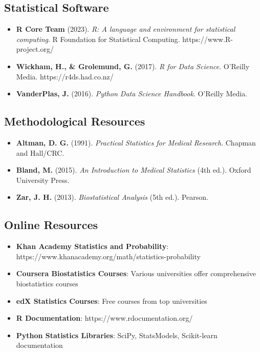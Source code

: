 \documentclass[
  11pt,
  letterpaper,
  oneside]{book}
\providecommand{\tightlist}{%
  \setlength{\itemsep}{0pt}\setlength{\parskip}{0pt}}\usepackage{longtable,booktabs,array}
\begin{document}
\subsection*{Statistical Software}\label{statistical-software}

\begin{itemize}
\tightlist
\item
  \textbf{R Core Team} (2023). \emph{R: A language and environment for
  statistical computing}. R Foundation for Statistical Computing.
  https://www.R-project.org/
\item
  \textbf{Wickham, H., \& Grolemund, G.} (2017). \emph{R for Data
  Science}. O'Reilly Media. https://r4ds.had.co.nz/
\item
  \textbf{VanderPlas, J.} (2016). \emph{Python Data Science Handbook}.
  O'Reilly Media.
\end{itemize}

\subsection*{Methodological Resources}\label{methodological-resources}

\begin{itemize}
\tightlist
\item
  \textbf{Altman, D. G.} (1991). \emph{Practical Statistics for Medical
  Research}. Chapman and Hall/CRC.
\item
  \textbf{Bland, M.} (2015). \emph{An Introduction to Medical
  Statistics} (4th ed.). Oxford University Press.
\item
  \textbf{Zar, J. H.} (2013). \emph{Biostatistical Analysis} (5th ed.).
  Pearson.
\end{itemize}

\subsection*{Online Resources}\label{online-resources}

\begin{itemize}
\tightlist
\item
  \textbf{Khan Academy Statistics and Probability}:
  https://www.khanacademy.org/math/statistics-probability
\item
  \textbf{Coursera Biostatistics Courses}: Various universities offer
  comprehensive biostatistics courses
\item
  \textbf{edX Statistics Courses}: Free courses from top universities
\item
  \textbf{R Documentation}: https://www.rdocumentation.org/
\item
  \textbf{Python Statistics Libraries}: SciPy, StatsModels, Scikit-learn
  documentation
\end{itemize}


\backmatter
\end{document}
